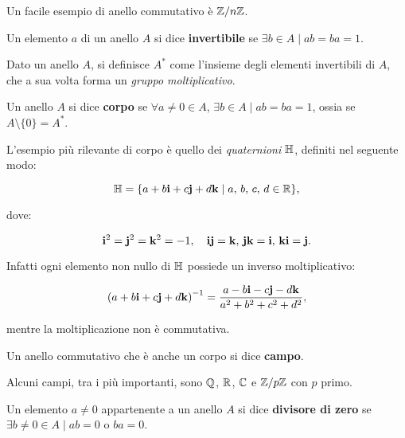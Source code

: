 \documentclass[11pt]{scrbook}
\begin{document}
\begin{example}
    Un facile esempio di anello commutativo è $\mathbb Z/n\mathbb Z$.
\end{example}

\begin{definition}
    Un elemento $a$ di un anello $A$ si dice \textbf{invertibile} se
    $\exists b \in A \mid ab = ba = 1$.
\end{definition}

\begin{definition}
    Dato un anello $A$, si definisce $A^*$ come l'insieme degli elementi
    invertibili di $A$, che a sua volta forma un \textit{gruppo moltiplicativo}.
\end{definition}

\begin{definition}
    Un anello $A$ si dice \textbf{corpo} se $\forall a \neq 0 \in A$, $\exists b \in A \mid ab=ba=1$,
    ossia se $A \setminus \{0\} = A^*$.
\end{definition}

\begin{example}
    L'esempio più rilevante di corpo è quello dei \textit{quaternioni} $\mathbb{H}$, definiti
    nel seguente modo:

    \[\mathbb{H} = \{a+b\mathbf{i}+c\mathbf{j}+d\mathbf{k} \mid a,\, b,\, c,\, d \in \mathbb R\},\]

    dove:

    \[\mathbf{i}^2 = \mathbf{j}^2 = \mathbf{k}^2 = -1, \quad \mathbf{i}\mathbf{j} = \mathbf{k},\, \mathbf{j}\mathbf{k} = \mathbf{i},\, \mathbf{k}\mathbf{i} = \mathbf{j}. \]

    Infatti ogni elemento non nullo di $\mathbb{H}$ possiede un inverso moltiplicativo:

    \[\left(a+b\mathbf{i}+c\mathbf{j}+d\mathbf{k}\right)^{-1} = \frac{a-b\mathbf{i}-c\mathbf{j}-d\mathbf{k}}{a^2+b^2+c^2+d^2},\]

    mentre la moltiplicazione non è commutativa.

\end{example}

\begin{definition}
    Un anello commutativo che è anche un corpo si dice \textbf{campo}.
\end{definition}

\begin{example}
    Alcuni campi, tra i più importanti, sono $\mathbb Q$, $\mathbb R$, $\mathbb C$ e $\mathbb Z/p\mathbb Z$ con
    $p$ primo.
\end{example}

\begin{definition}
    Un elemento $a \neq 0$ appartenente a un anello $A$ si dice \textbf{divisore di zero} se
    $\exists b \neq 0 \in A \mid ab = 0$ o $ba = 0$.
\end{definition}
\end{document}
